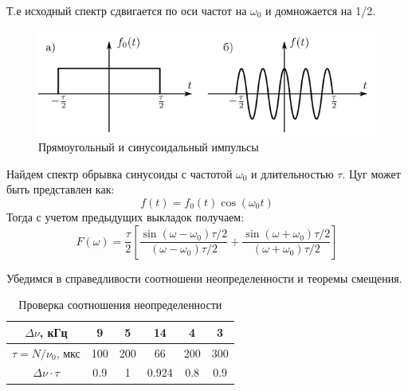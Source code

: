Т.е исходный спектр сдвигается по оси частот на $\omega_0$ и домножается на 1/2.
\begin{figure}[h!]
    \centering
    \includegraphics[width=12cm]{./images/прямоуг_син_сигнал.png}
    \caption{Прямоугольный и синусоидальный импульсы}
\end{figure}
\indent Найдем спектр обрывка синусоиды с частотой $\omega_0$ и длительностью $\tau$. Цуг может быть представлен как:
\begin{equation}
    f(t) = f_0(t)\cos(\omega_0 t)
\end{equation}
Тогда с учетом предыдущих выкладок получаем:
\begin{equation}
    F(\omega) = \frac{\tau}{2}\left [ \frac{\sin(\omega - \omega_0)\tau / 2}{(\omega - \omega_0)\tau/2} + \frac{\sin(\omega + \omega_0)\tau / 2}{(\omega + \omega_0)\tau/2}\right ]
\end{equation}

Убедимся в справедливости соотношени неопределенности и теоремы смещения.
\begin{table}[!h]
    \centering
    \begin{tabular}{|c|c|c|c|c|c|}
        \hline
        $\Delta\nu$, кГц & 9 & 5 & 14 & 4 & 3 \\\hline
        $\tau = N / \nu_0$, мкс & 100 &200 & 66 & 200 & 300 \\\hline
        $\Delta\nu\cdot\tau$ & 0.9 & 1 & 0.924 & 0.8 & 0.9\\\hline
    \end{tabular}
    \caption{Проверка соотношения неопределенности}
\end{table}

